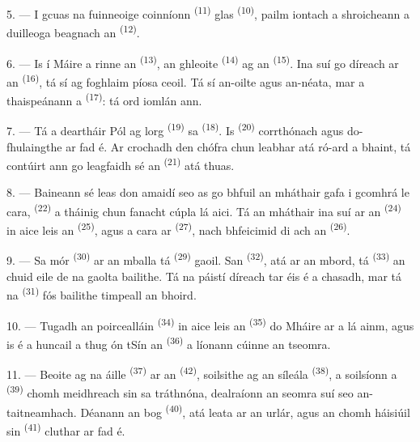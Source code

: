 5. --- I gcuas na fuinneoige coinníonn 
\textsuperscript{(11)}  glas \textsuperscript{(10)}, pailm iontach a
shroicheann a duilleoga beagnach an 
\textsuperscript{(12)}.

6. --- Is í Máire a rinne an  \textsuperscript{(13)}, an
 ghleoite \textsuperscript{(14)} ag an 
\textsuperscript{(15)}. Ina suí go díreach ar an 
\textsuperscript{(16)}, tá sí ag foghlaim píosa ceoil. Tá sí an-oilte agus
an-néata, mar a thaispeánann a  \textsuperscript{(17)}: tá ord
iomlán ann.

\VUsaut{5.0mm}
\VUsaut{3.0mm}

7. --- Tá a deartháir Pól ag lorg  \textsuperscript{(19)} sa
 \textsuperscript{(18)}. Is 
\textsuperscript{(20)} corrthónach agus do-fhulaingthe ar fad é. Ar crochadh den
chófra chun leabhar atá ró-ard a bhaint, tá contúirt ann go leagfaidh sé an
 \textsuperscript{(21)} atá thuas.

8. --- Baineann sé leas don amaidí seo as go bhfuil an mháthair gafa i gcomhrá le
cara,  \textsuperscript{(22)} a tháinig chun fanacht cúpla lá
aici. Tá an mháthair ina suí ar an  \textsuperscript{(24)} in aice
leis an  \textsuperscript{(25)}, agus a cara ar
 \textsuperscript{(27)}, nach bhfeicimid di ach an
 \textsuperscript{(26)}.

9. --- Sa  mór \textsuperscript{(30)} ar an mballa tá
 \textsuperscript{(29)} gaoil. San 
\textsuperscript{(32)}, atá ar an mbord, tá 
\textsuperscript{(33)} an chuid eile de na gaolta bailithe. Tá na páistí díreach tar
éis é a chasadh, mar tá na  \textsuperscript{(31)} fós
bailithe timpeall an bhoird.

10. --- Tugadh an  poircealláin \textsuperscript{(34)} in aice
leis an  \textsuperscript{(35)} do Mháire ar a lá ainm, agus
is é a huncail a thug ón tSín an  \textsuperscript{(36)} a
líonann cúinne an tseomra.

11. --- Beoite ag na  áille \textsuperscript{(37)} ar an
 \textsuperscript{(42)}, soilsithe ag an 
síleála \textsuperscript{(38)}, a soilsíonn a 
\textsuperscript{(39)} chomh meidhreach sin sa tráthnóna, dealraíonn an seomra suí
seo an-taitneamhach. Déanann an  bog \textsuperscript{(40)}, atá
leata ar an urlár, agus an  chomh háisiúil sin
\textsuperscript{(41)} cluthar ar fad é.

